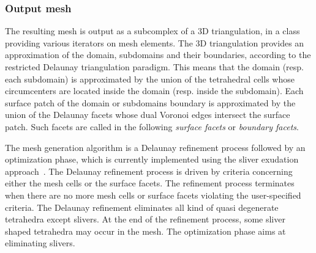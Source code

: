 
\subsubsection{Output mesh}
\label{introsec:param}

The resulting mesh is output as a subcomplex of a 3D triangulation,
in a class  providing various iterators
on mesh elements. The 3D triangulation provides an approximation of the
domain, subdomains and their boundaries, according to the restricted
Delaunay triangulation paradigm. This means that the domain
(resp. each subdomain) is approximated by the union of  the tetrahedral cells
 whose circumcenters are located inside the domain
(resp. inside the subdomain). 
Each surface patch of the domain or subdomains boundary is approximated
by the union of   the Delaunay facets whose dual Voronoi edges intersect the surface patch.
Such facets are called in the following {\em surface facets} or {\em boundary facets}. 

The mesh generation algorithm is a Delaunay refinement process
followed by an optimization  phase, which is currently implemented
using the  sliver exudation approach~\cite{cgal:cdeft-slive-00}.
The   Delaunay refinement process is driven by criteria
concerning either the mesh cells 
or the surface facets.
The refinement process terminates when there are
no more mesh cells or  surface facets violating the user-specified criteria.
The Delaunay refinement eliminates all kind of 
 quasi degenerate tetrahedra except slivers.
At the end of the refinement process,
some sliver shaped tetrahedra may occur in the mesh.
The optimization phase aims at eliminating slivers.




